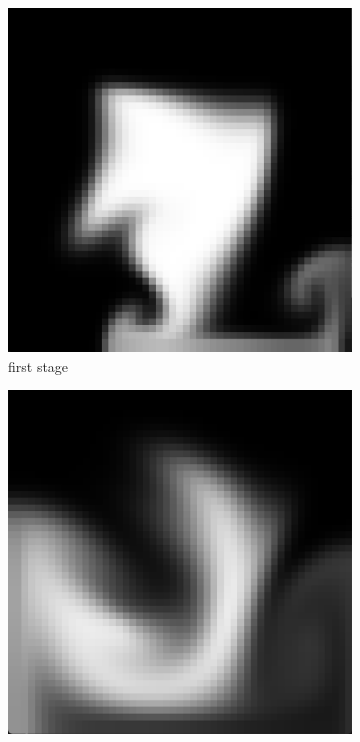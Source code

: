 \begin{figure}[h]
\begin{subfigure}[b]{0.2\textwidth}
        \includegraphics[width=\textwidth]{figures/grid50_1.png}
        \caption{first stage}
    \end{subfigure}
    \begin{subfigure}[b]{0.2\textwidth}
        \includegraphics[width=\textwidth]{figures/grid50_2.png}

\end{subfigure}
\end{figure}

